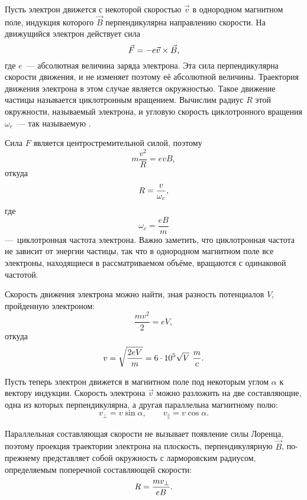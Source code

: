 Пусть электрон движется с некоторой скоростью $\vec{v}$ в однородном магнитном поле, индукция которого $\vec{B}$
перпендикулярна направлению скорости. На движущийся электрон действует сила %
\begin{equation}
	\eqmark{3.1}
	\vec{F}=-e{\vec{v}}\times{\vec{B}},
\end{equation}
где $e$~--- абсолютная величина заряда электрона. Эта сила перпендикулярна скорости движения, и не изменяет поэтому её абсолютной величины. Траектория движения электрона в этом случае является окружностью. Такое движение частицы называется циклотронным вращением. Вычислим радиус $R$ этой окружности, называемый  электрона, и угловую скорость циклотронного вращения $\omega_c$~--- так называемую .

Сила $F$ является центростремительной силой, поэтому
\begin{equation*}
	m\frac{v^2}{R}=evB,
\end{equation*}
откуда
\begin{equation}
	\eqmark{3.2}
	R =\frac{v}{\omega_c},
\end{equation}
где
\begin{equation*}
	\omega_c=\frac{eB}{m}
\end{equation*}
---~циклотронная частота электрона. Важно заметить, что циклотронная частота не зависит от энергии частицы, так что в однородном магнитном поле все электроны, находящиеся в рассматриваемом объёме, вращаются с одинаковой частотой.

Скорость движения электрона можно найти, зная разность потенциалов $V$, пройденную электроном:
\begin{equation*}
	\frac{mv^2}{2}=eV,
\end{equation*}
откуда
\begin{equation}
	\eqmark{3.3}
	v=\sqrt{\frac{2eV}{m}} = 6\cdot10^5\sqrt{V}~\frac{m}{c}.
\end{equation}

Пусть теперь электрон движется в магнитном поле под некоторым углом $\alpha$ к вектору индукции. Скорость электрона
$\vec{v}$ можно разложить на две составляющие, одна из которых перпендикулярна, а другая параллельна магнитному полю:
\begin{equation*}
	v_{\bot}=v\sin\alpha,\qquad v_{\parallel}=v\cos\alpha.
\end{equation*}

Параллельная составляющая скорости не вызывает появление силы Лоренца, поэтому проекция траектории электрона на
плоскость, перпендикулярную $\vec{B}$, по-прежнему представляет собой окружность с ларморовским радиусом, определяемым поперечной составляющей скорости:
\begin{equation}
	\eqmark{3.4}
	R =\frac{mv_{\bot}}{eB}.
\end{equation}

